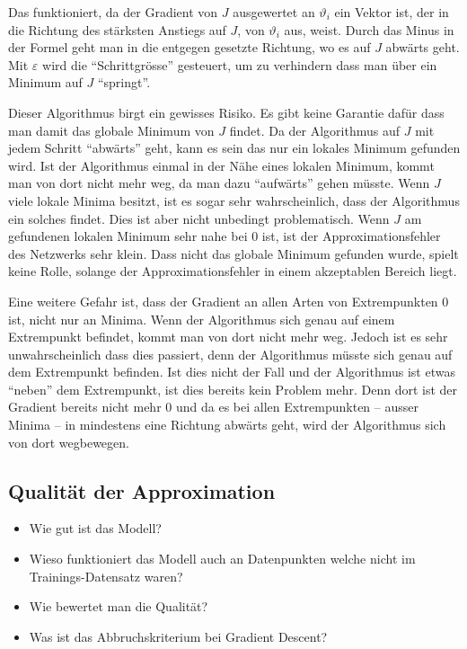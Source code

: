 Das funktioniert, da der Gradient von \( J \) ausgewertet an \( \vartheta_i \) ein Vektor ist, der in die Richtung des stärksten Anstiegs auf \( J \), von \(\vartheta_i \) aus, weist.
Durch das Minus in der Formel geht man in die entgegen gesetzte Richtung, wo es auf \( J \) abwärts geht. 
Mit \( \varepsilon \) wird die ``Schrittgrösse'' gesteuert, um zu verhindern dass man über ein Minimum auf \( J \) ``springt''.

Dieser Algorithmus birgt ein gewisses Risiko. 
Es gibt keine Garantie dafür dass man damit das globale Minimum von \( J \) findet.
Da der Algorithmus auf \( J \) mit jedem Schritt ``abwärts'' geht, kann es sein das nur ein lokales Minimum gefunden wird.
Ist der Algorithmus einmal in der Nähe eines lokalen Minimum, kommt man von dort nicht mehr weg, da man dazu ``aufwärts'' gehen müsste.
Wenn \( J \) viele lokale Minima besitzt, ist es sogar sehr wahrscheinlich, dass der Algorithmus ein solches findet.
Dies ist aber nicht unbedingt problematisch.
Wenn \( J \) am gefundenen lokalen Minimum sehr nahe bei 0 ist, ist der Approximationsfehler des Netzwerks sehr klein.
Dass nicht das globale Minimum gefunden wurde, spielt keine Rolle, solange der Approximationsfehler in einem akzeptablen Bereich liegt.

Eine weitere Gefahr ist, dass der Gradient an allen Arten von Extrempunkten 0 ist, nicht nur an Minima.
Wenn der Algorithmus sich genau auf einem Extrempunkt befindet, kommt man von dort nicht mehr weg.
Jedoch ist es sehr unwahrscheinlich dass dies passiert, denn der Algorithmus müsste sich genau auf dem Extrempunkt befinden.
Ist dies nicht der Fall und der Algorithmus ist etwas ``neben'' dem Extrempunkt, ist dies bereits kein Problem mehr.
Denn dort ist der Gradient bereits nicht mehr 0 und da es bei allen Extrempunkten -- ausser Minima -- in mindestens eine Richtung abwärts geht, wird der Algorithmus sich von dort wegbewegen.


\subsection{Qualität der Approximation}\label{neuronal:subsection:qualität_nn}

\begin{itemize}
    \item Wie gut ist das Modell?
    \item Wieso funktioniert das Modell auch an Datenpunkten welche nicht im Trainings-Datensatz waren?
    \item Wie bewertet man die Qualität?
    \item Was ist das Abbruchskriterium bei Gradient Descent?
\end{itemize}
